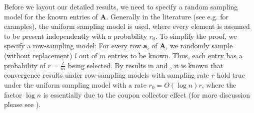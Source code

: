\documentclass[twoside,11pt]{article}
\begin{document}
Before we layout our detailed results, we need to specify a random sampling model for the known entries of $\bm{A}$. Generally in the literature (see e.g. \cite{candesexact,jin2016provable,ge2016matrix} for examples),
 the uniform sampling model is used, where every element is assumed to be present independently with a probability $r_0$.  To simplify the proof,  we  specify a row-sampling model: For every row $\bm{a}_i$ of $\bm{A}$, we randomly sample (without replacement) $l$ out of $m$ entries to be known. Thus, each entry has a probability of $r=\frac{l}{m}$ being selected. 
   By results in \cite{candesexact} and \cite{gross2010note}, it is known that convergence results under row-sampling models with sampling rate $r$ hold true under the uniform sampling model with a rate $r_0=O(\log n)r$, where the factor $\log n$ is essentially due to the coupon collector effect (for more discussion please see \cite{candesexact}). 
\end{document}
